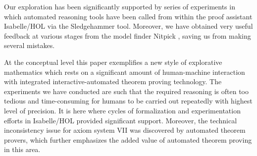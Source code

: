 
Our exploration has been significantly supported by series of
experiments in which automated reasoning tools have been called from
within the proof assistant Isabelle/HOL via the
Sledgehammer tool. Moreover, we have obtained
very useful feedback at various stages from the model finder Nitpick
\cite{Nitpick}, saving us from making several mistakes.

At the conceptual level this paper exemplifies a new style of
explorative mathematics which rests on a significant amount of
human-machine interaction with integrated interactive-auto\-ma\-ted
theorem proving technology. The experiments we have conducted are such
that the required reasoning is often too tedious and time-consuming
for humans to be carried out repeatedly with highest level of
precision. It is here where cycles of formalization and
experimentation efforts in Isabelle/HOL provided significant
support. Moreover, the technical inconsistency issue for axiom system
VII was discovered by automated theorem provers, which further
emphasizes the added value of automated theorem proving in this area.

